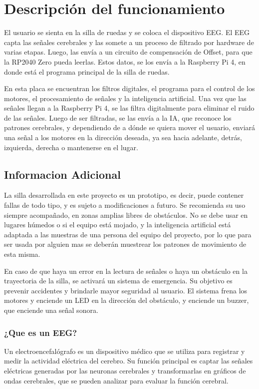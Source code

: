 \documentclass{article}
\begin{document}
\section{Descripción del funcionamiento}
El usuario se sienta en la silla de ruedas y se coloca el dispositivo EEG. El EEG capta las señales cerebrales y las somete a un proceso de filtrado por hardware de varias etapas. Luego, las envía a un circuito de compensación de Offset, para que la RP2040 Zero pueda leerlas. Estos datos, se los envía a la Raspberry Pi 4, en donde está el programa principal de la silla de ruedas.

En esta placa se encuentran los filtros digitales, el programa para el control de los motores, el procesamiento de señales y la inteligencia artificial. Una vez que las señales llegan a la Raspberry Pi 4, se las filtra digitalmente para eliminar el ruido de las señales. Luego de ser filtradas, se las envía a la IA, que reconoce los patrones cerebrales, y dependiendo de a dónde se quiera mover el usuario, enviará una señal a los motores en la dirección deseada, ya sea hacia adelante, detrás, izquierda, derecha o mantenerse en el lugar.


\subsection {Informacion Adicional}
La silla desarrollada en este proyecto es un prototipo, es decir, puede contener fallas de todo tipo, y es sujeto a modificaciones a futuro. Se recomienda su uso siempre acompañado, en zonas amplias libres de obstáculos. No se debe usar en lugares húmedos o si el equipo está mojado, y la inteligencia artificial está adaptada a las muestras de una persona del equipo del proyecto, por lo que para ser usada por alguien mas se deberán muestrear los patrones de movimiento de esta misma.

En caso de que haya un error en la lectura de señales o haya un obstáculo en la trayectoria de la silla, se activará un sistema de emergencia. Su objetivo es prevenir accidentes y brindarle mayor seguridad al usuario. El sistema frena los motores y enciende un LED en la dirección del obstáculo, y enciende un buzzer, que enciende una señal sonora.

\subsubsection{¿Que es un EEG?}

Un electroencefalógrafo es un dispositivo médico que se utiliza para registrar y medir la actividad eléctrica del cerebro. Su función principal es captar las señales eléctricas generadas por las neuronas cerebrales y transformarlas en gráficos de ondas cerebrales, que se pueden analizar para evaluar la función cerebral.
\end{document}

